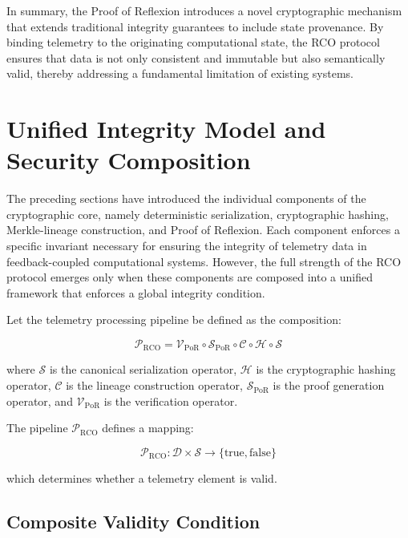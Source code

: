 In summary, the Proof of Reflexion introduces a novel cryptographic mechanism that extends traditional integrity guarantees to include state provenance. By binding telemetry to the originating computational state, the RCO protocol ensures that data is not only consistent and immutable but also semantically valid, thereby addressing a fundamental limitation of existing systems.

\section{Unified Integrity Model and Security Composition}

The preceding sections have introduced the individual components of the cryptographic core, namely deterministic serialization, cryptographic hashing, Merkle-lineage construction, and Proof of Reflexion. Each component enforces a specific invariant necessary for ensuring the integrity of telemetry data in feedback-coupled computational systems. However, the full strength of the RCO protocol emerges only when these components are composed into a unified framework that enforces a global integrity condition.

Let the telemetry processing pipeline be defined as the composition:

\begin{equation}
\mathcal{P}_{\text{RCO}} = \mathcal{V}_{\text{PoR}} \circ \mathcal{S}_{\text{PoR}} \circ \mathcal{C} \circ \mathcal{H} \circ \mathcal{S}
\end{equation}

where $\mathcal{S}$ is the canonical serialization operator, $\mathcal{H}$ is the cryptographic hashing operator, $\mathcal{C}$ is the lineage construction operator, $\mathcal{S}_{\text{PoR}}$ is the proof generation operator, and $\mathcal{V}_{\text{PoR}}$ is the verification operator.

The pipeline $\mathcal{P}_{\text{RCO}}$ defines a mapping:

\begin{equation}
\mathcal{P}_{\text{RCO}}: \mathcal{D} \times \mathcal{S} \rightarrow \{\text{true}, \text{false}\}
\end{equation}

which determines whether a telemetry element is valid.

\subsection{Composite Validity Condition}

